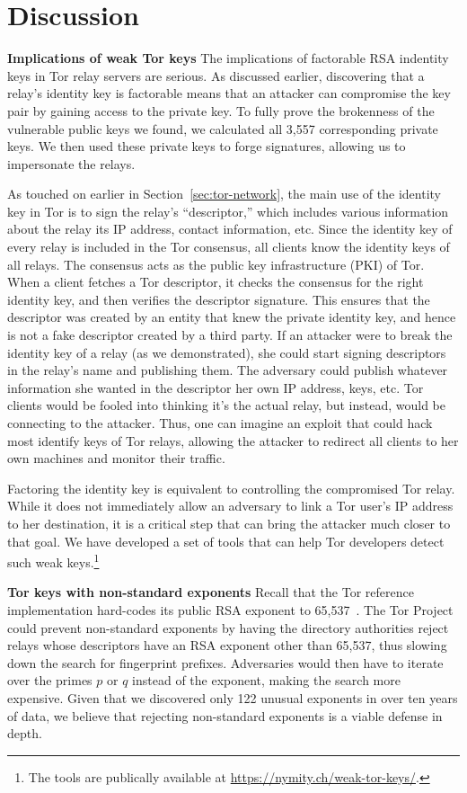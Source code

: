 \section{Discussion}
\label{sec:discussion}
\textbf{Implications of weak Tor keys}
The implications of factorable RSA indentity keys in Tor relay servers are
serious. As discussed earlier, discovering that a relay's identity key is
factorable means that an attacker can compromise the key pair by gaining access
to the private key. To fully prove the brokenness of the vulnerable public keys
we found, we calculated all 3,557 corresponding private keys. We then used these
private keys to forge signatures, allowing us to impersonate the relays.

As touched on earlier in Section~\ref{sec:tor-network}, the main use of the
identity key in Tor is to sign the relay's ``descriptor,'' which
includes various information about the relay \eg its IP address, contact
information, etc. Since the identity key of every relay is included in the Tor
consensus, all clients know the identity keys of all relays. The consensus acts
as the public key infrastructure (PKI) of Tor. When a client fetches a Tor
descriptor, it checks the consensus for the right identity key, and then
verifies the descriptor signature. This ensures that the descriptor was created
by an entity that knew the private identity key, and hence is not a fake
descriptor created by a third party. If an attacker were to break the identity
key of a relay (as we demonstrated), she could start signing descriptors in the
relay's name and publishing them. The adversary could publish whatever
information she wanted in the descriptor \eg her own IP address, keys, etc. Tor
clients would be fooled into thinking it's the actual relay, but instead, would
be connecting to the attacker. Thus, one can imagine an exploit that could hack
most identify keys of Tor relays, allowing the attacker to redirect all clients
to her own machines and monitor their traffic.

Factoring the identity key is equivalent to controlling the compromised Tor
relay. While it does not immediately allow an adversary to link a Tor user's IP
address to her destination, it is a critical step that can bring the attacker
much closer to that goal. We have developed a set of tools that can help Tor
developers detect such weak keys.\footnote{The tools are publically available at
\url{https://nymity.ch/weak-tor-keys/}.}

\textbf{Tor keys with non-standard exponents} Recall that the Tor reference
implementation hard-codes its public RSA exponent to
65,537~\cite[\S~0.3]{torspec}.  The Tor Project could prevent non-standard
exponents by having the directory authorities reject relays whose descriptors
have an RSA exponent other than 65,537, thus slowing down the search for
fingerprint prefixes.  Adversaries would then have to iterate over the primes
$p$ or $q$ instead of the exponent, making the search more expensive.  Given
that we discovered only 122 unusual exponents in over ten years of data, we
believe that rejecting non-standard exponents is a viable defense in depth.

